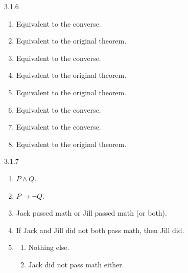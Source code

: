 \documentclass[11pt,]{book}
\theoremstyle{ptxplainnotitle}
\theoremstyle{ptxplaintitle}
\theoremstyle{ptxdefinitionnotitle}
\theoremstyle{ptxdefinitiontitle}
\theoremstyle{ptxdefinitionnotitle}
\theoremstyle{ptxdefinitiontitle}
\theoremstyle{ptxdefinitionnotitle}
\theoremstyle{ptxdefinitiontitle}
\theoremstyle{ptxdefinitiontitlenonumber}
\theoremstyle{ptxdefinitiontitlenonumber}
\numberwithin{equation}{chapter}
\newcommand{\imp}{\rightarrow}
\begin{document}
\begin{divisionexercise}{3.1.6}
\textbf{}\hypertarget{p-2088}{}%
\leavevmode%
\begin{enumerate}[label=(\alph*)]
\item\hypertarget{li-1021}{}\hypertarget{p-2089}{}%
Equivalent to the converse.%
\item\hypertarget{li-1022}{}\hypertarget{p-2090}{}%
Equivalent to the original theorem.%
\item\hypertarget{li-1023}{}\hypertarget{p-2091}{}%
Equivalent to the converse.%
\item\hypertarget{li-1024}{}\hypertarget{p-2092}{}%
Equivalent to the original theorem.%
\item\hypertarget{li-1025}{}\hypertarget{p-2093}{}%
Equivalent to the original theorem.%
\item\hypertarget{li-1026}{}\hypertarget{p-2094}{}%
Equivalent to the converse.%
\item\hypertarget{li-1027}{}\hypertarget{p-2095}{}%
Equivalent to the converse.%
\item\hypertarget{li-1028}{}\hypertarget{p-2096}{}%
Equivalent to the original theorem.%
\end{enumerate}
%
\end{divisionexercise}%
\begin{divisionexercise}{3.1.7}
\textbf{}\hypertarget{p-2103}{}%
\leavevmode%
\begin{enumerate}[label=(\alph*)]
\item\hypertarget{li-1036}{}\(P \wedge Q\).%
\item\hypertarget{li-1037}{}\(P \imp \neg Q\).%
\item\hypertarget{li-1038}{}\hypertarget{p-2104}{}%
Jack passed math or Jill passed math (or both).%
\item\hypertarget{li-1039}{}\hypertarget{p-2105}{}%
If Jack and Jill did not both pass math, then Jill did.%
\item\hypertarget{li-1040}{}\hypertarget{p-2106}{}%
%
\begin{enumerate}[label=\roman*.]
\item\hypertarget{li-1041}{}Nothing else.%
\item\hypertarget{li-1042}{}Jack did not pass math either.%
\end{enumerate}
%
\end{enumerate}
%
\end{divisionexercise}%
\end{document}
